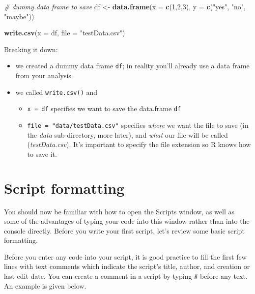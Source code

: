 \documentclass[
]{book}
\newenvironment{Shaded}{\begin{snugshade}}{\end{snugshade}}
\newcommand{\AttributeTok}[1]{\textcolor[rgb]{0.13,0.29,0.53}{#1}}
\newcommand{\CommentTok}[1]{\textcolor[rgb]{0.56,0.35,0.01}{\textit{#1}}}
\newcommand{\DecValTok}[1]{\textcolor[rgb]{0.00,0.00,0.81}{#1}}
\newcommand{\FunctionTok}[1]{\textcolor[rgb]{0.13,0.29,0.53}{\textbf{#1}}}
\newcommand{\NormalTok}[1]{#1}
\newcommand{\OtherTok}[1]{\textcolor[rgb]{0.56,0.35,0.01}{#1}}
\newcommand{\StringTok}[1]{\textcolor[rgb]{0.31,0.60,0.02}{#1}}
\providecommand{\tightlist}{%
  \setlength{\itemsep}{0pt}\setlength{\parskip}{0pt}}
\begin{document}
\begin{Shaded}
\begin{Highlighting}[]
\CommentTok{\# dummy data frame to save}
\NormalTok{df }\OtherTok{\textless{}{-}} \FunctionTok{data.frame}\NormalTok{(}\AttributeTok{x =} \FunctionTok{c}\NormalTok{(}\DecValTok{1}\NormalTok{,}\DecValTok{2}\NormalTok{,}\DecValTok{3}\NormalTok{),}
                 \AttributeTok{y =} \FunctionTok{c}\NormalTok{(}\StringTok{"yes"}\NormalTok{, }\StringTok{"no"}\NormalTok{, }\StringTok{"maybe"}\NormalTok{))}

\FunctionTok{write.csv}\NormalTok{(}\AttributeTok{x =}\NormalTok{ df, }
          \AttributeTok{file =} \StringTok{"testData.csv"}\NormalTok{)}
\end{Highlighting}
\end{Shaded}

Breaking it down:

\begin{itemize}
\tightlist
\item
  we created a dummy data frame \texttt{df}; in reality you'll already use a data frame from your analysis.
\item
  we called \texttt{write.csv()} and

  \begin{itemize}
  \tightlist
  \item
    \texttt{x\ =\ df} specifies we want to save the data.frame \texttt{df}
  \item
    \texttt{file\ =\ "data/testData.csv"} specifies \emph{where} we want the file to save (in the \emph{data} sub-directory, more later), and \emph{what} our file will be called (\emph{testData.csv}). It's important to specify the file extension so R knows how to save it.
  \end{itemize}
\end{itemize}

\hypertarget{script-formatting}{%
\section{Script formatting}\label{script-formatting}}

You should now be familiar with how to open the Scripts window, as well as some of the advantages of typing your code into this window rather than into the console directly. Before you write your first script, let's review some basic script formatting.

Before you enter any code into your script, it is good practice to fill the first few lines with text comments which indicate the script's title, author, and creation or last edit date. You can create a comment in a script by typing \texttt{\#} before any text. An example is given below.
\end{document}

